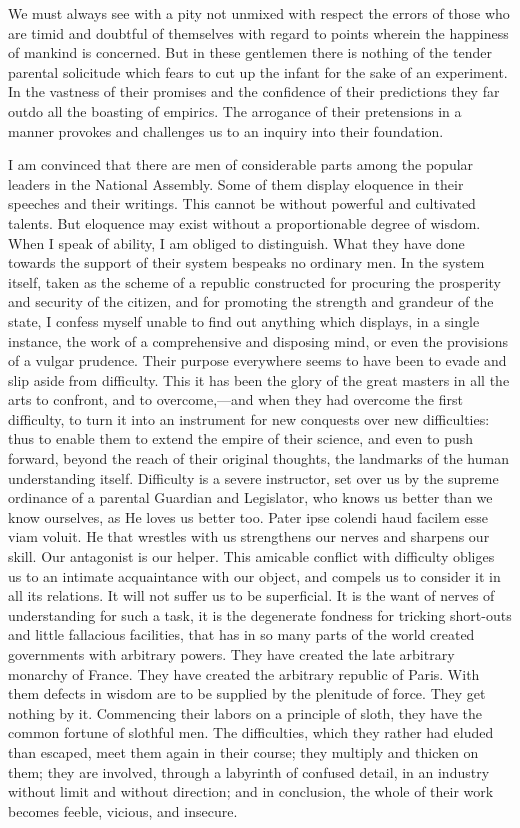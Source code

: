 We must always see with a pity not unmixed with respect the errors of those who are timid and doubtful of themselves with regard to points wherein the happiness of mankind is concerned. But in these gentlemen there is nothing of the tender parental solicitude which fears to cut up the infant for the sake of an experiment. In the vastness of their promises and the confidence of their predictions they far outdo all the boasting of empirics. The arrogance of their pretensions in a manner provokes and challenges us to an inquiry into their foundation.

I am convinced that there are men of considerable parts among the popular leaders in the National Assembly. Some of them display eloquence in their speeches and their writings. This cannot be without powerful and cultivated talents. But eloquence may exist without a proportionable degree of wisdom. When I speak of ability, I am obliged to distinguish. What they have done towards the support of their system bespeaks no ordinary men. In the system itself, taken as the scheme of a republic constructed for procuring the prosperity and security of the citizen, and for promoting the strength and grandeur of the state, I confess myself unable to find out anything which displays, in a single instance, the work of a comprehensive and disposing mind, or even the provisions of a vulgar prudence. Their purpose everywhere seems to have been to evade and slip aside from difficulty. This it has been the glory of the great masters in all the arts to confront, and to overcome,—and when they had overcome the first difficulty, to turn it into an instrument for new conquests over new difficulties: thus to enable them to extend the empire of their science, and even to push forward, beyond the reach of their original thoughts, the landmarks of the human understanding itself. Difficulty is a severe instructor, set over us by the supreme ordinance of a parental Guardian and Legislator, who knows us better than we know ourselves, as He loves us better too. Pater ipse colendi haud facilem esse viam voluit. He that wrestles with us strengthens our nerves and sharpens our skill. Our antagonist is our helper. This amicable conflict with difficulty obliges us to an intimate acquaintance with our object, and compels us to consider it in all its relations. It will not suffer us to be superficial. It is the want of nerves of understanding for such a task, it is the degenerate fondness for tricking short-outs and little fallacious facilities, that has in so many parts of the world created governments with arbitrary powers. They have created the late arbitrary monarchy of France. They have created the arbitrary republic of Paris. With them defects in wisdom are to be supplied by the plenitude of force. They get nothing by it. Commencing their labors on a principle of sloth, they have the common fortune of slothful men. The difficulties, which they rather had eluded than escaped, meet them again in their course; they multiply and thicken on them; they are involved, through a labyrinth of confused detail, in an industry without limit and without direction; and in conclusion, the whole of their work becomes feeble, vicious, and insecure.

